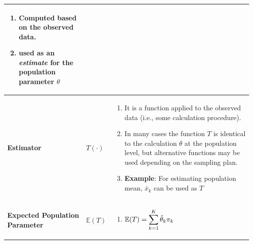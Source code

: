 \begin{customArrayStretch}{1.3}
\begin{longtable}{>{\RaggedRight\arraybackslash}p{4cm} >{\centering\arraybackslash}p{0.5cm} p{10.5cm}}
\begin{minipage}{10.3cm}
\begin{enumerate}[itemsep=0.2cm]
            \item Computed based on the observed data.
            \hfill \cite{statistics/book/Statistics-for-Data-Scientists/Maurits-Kaptein}

            \item used as an \textit{estimate} for the population parameter $\theta$
            \hfill \cite{statistics/book/Statistics-for-Data-Scientists/Maurits-Kaptein}
            
        \end{enumerate}
        \vspace{0.15cm}
    \end{minipage} 
    \\ \hline

\textbf{Estimator} &
    $T(\cdot)$ &
    \begin{minipage}{10.3cm}
        \vspace{0.15cm}
        \begin{enumerate}[itemsep=0.2cm]
            \item It is a function applied to the observed data (i.e., some calculation procedure). 
            \hfill \cite{statistics/book/Statistics-for-Data-Scientists/Maurits-Kaptein}

            \item In many cases the function $T$ is identical to the calculation $\theta$ at the population level, but alternative functions may be used depending on the sampling plan.
            \hfill \cite{statistics/book/Statistics-for-Data-Scientists/Maurits-Kaptein}

            \item \textbf{Example}: For estimating population mean, $\bar{x}_k$ can be used as $T$ 
            \hfill \cite{statistics/book/Statistics-for-Data-Scientists/Maurits-Kaptein}
        \end{enumerate}
        \vspace{0.15cm}
    \end{minipage} 
    \\ \hline

\textbf{Expected Population Parameter} &
    $\mathbb{E}(T)$ &
    \begin{minipage}{10.3cm}
        \vspace{0.15cm}
        \begin{enumerate}[itemsep=0.2cm]
            \item $
                \mathbb{E}(T)
                = \displaystyle\sum_{k=1}^{K} \hat{\theta}_k \pi_k
            $
            \hfill \cite{statistics/book/Statistics-for-Data-Scientists/Maurits-Kaptein}


\end{enumerate}
\end{minipage}
\end{longtable}
\end{customArrayStretch}
